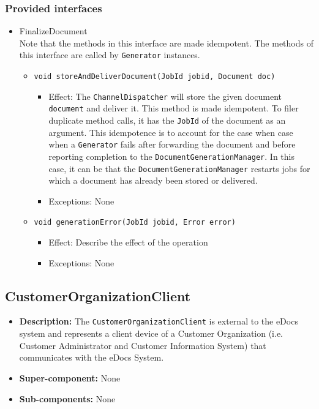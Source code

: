 \documentclass[a4paper,10pt]{article}
\begin{document}
\subsubsection*{Provided interfaces}
\begin{itemize}
    \item FinalizeDocument\\
    Note that the methods in this interface are made idempotent. The methods of this interface are called by \texttt{Generator} instances. 
    \begin{itemize}
        \item \texttt{void storeAndDeliverDocument(JobId jobid, Document doc)}
        \begin{itemize}
            \item Effect: The \texttt{ChannelDispatcher} will store the given document \texttt{document} and deliver it. This method is made idempotent. To filer duplicate method calls, it has the \texttt{JobId} of the document as an argument. This idempotence is to account for the case when case when a \texttt{Generator} fails after forwarding the document and before reporting completion to the \texttt{DocumentGenerationManager}. In this case, it can be that the \texttt{DocumentGenerationManager} restarts jobs for which a document has already been stored or delivered.
            \item Exceptions: None
		\end{itemize}
		
        \item \texttt{void generationError(JobId jobid, Error error)}
        \begin{itemize}
            \item Effect: Describe the effect of the operation
            \item Exceptions: None
        \end{itemize}
    \end{itemize}
\end{itemize}

\subsection{CustomerOrganizationClient}
\begin{itemize}
    \item \textbf{Description:} The \texttt{CustomerOrganizationClient} is external to the eDocs system and represents a client device of a Customer  Organization (i.e. Customer Administrator and Customer Information System) that communicates with the eDocs System.
    \item \textbf{Super-component:} None
    \item \textbf{Sub-components:} None
\end{itemize}
\end{document}
